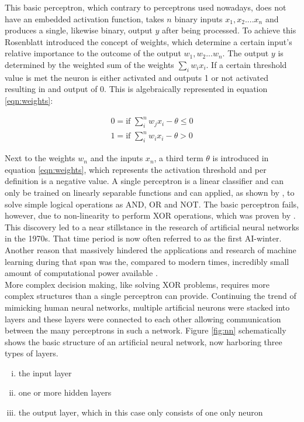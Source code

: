 This basic perceptron, which contrary to perceptrons used nowadays, does not have an embedded
activation function, takes $n$ binary inputs $x_1 , x_2 .... x_n$ and produces a single, likewise
binary, output $y$ after being processed. To achieve this Rosenblatt introduced the concept of
weights, which determine a certain input's relative importance to the outcome of the output
$w_1 , w_2 ... w_n$. The output $y$ is determined by the weighted sum of the weights
$\sum_i w_ix_i $. If a certain threshold value is met the neuron is either activated and outputs 1
or not activated resulting in and output of 0. This is algebraically represented in equation
\ref{eqn:weights}:

\begin{subequations}
 \begin{align}
  0 = \mbox{if } \sum_i^n w_j x_i - \theta \leq 0 \\
  1 = \mbox{if } \sum_i^n w_i x_i - \theta > 0
 \end{align}
 \label{eqn:weights}
\end{subequations}


Next to the weights $w_n$ and the inputs $x_n$, a third term $\theta$ is introduced in equation
\ref{eqn:weights}, which represents the activation threshold and per definition is a negative
value. A single perceptron is a linear classifier and can only be trained on linearly separable
functions and can applied, as shown by \cite{rosenblatt1961}, to solve simple logical operations as
AND, OR and NOT. The basic perceptron fails, however, due to non-linearity to perform XOR
operations, which was proven by \cite{marvin1969}. This discovery led to a near stillstance in the
research of artificial neural networks in the 1970s. That time period is now often referred to as
the first AI-winter. Another reason that massively hindered the applications and research of machine
learning during that span was the, compared to
modern times, incredibly small amount of computational power available \cite{nguyen1990truck}. \\
More complex decision making, like solving XOR problems, requires more complex structures than a
single perceptron can provide. Continuing the trend of mimicking human neural networks, multiple
artificial neurons were stacked into layers and these layers were connected to each other allowing
communication between the many perceptrons in such a network. Figure \ref{fig:nn} schematically
shows the basic structure of an artificial neural network, now harboring three types of layers.
\begin{enumerate}[(i)]
\item the input layer
\item one or more hidden layers
\item the output layer, which in this case only consists of one only neuron
\end{enumerate}

